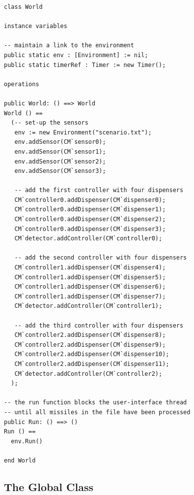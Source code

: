 \documentclass{overturerepchap}
\begin{document}
\begin{lstlisting}
class World

instance variables
  
-- maintain a link to the environment
public static env : [Environment] := nil;
public static timerRef : Timer := new Timer();

operations

public World: () ==> World
World () ==
  (-- set-up the sensors
   env := new Environment("scenario.txt");
   env.addSensor(CM`sensor0);
   env.addSensor(CM`sensor1);
   env.addSensor(CM`sensor2);
   env.addSensor(CM`sensor3);

   -- add the first controller with four dispensers
   CM`controller0.addDispenser(CM`dispenser0);
   CM`controller0.addDispenser(CM`dispenser1);
   CM`controller0.addDispenser(CM`dispenser2);
   CM`controller0.addDispenser(CM`dispenser3);
   CM`detector.addController(CM`controller0);

   -- add the second controller with four dispensers
   CM`controller1.addDispenser(CM`dispenser4);
   CM`controller1.addDispenser(CM`dispenser5);
   CM`controller1.addDispenser(CM`dispenser6);
   CM`controller1.addDispenser(CM`dispenser7);
   CM`detector.addController(CM`controller1);
 
   -- add the third controller with four dispensers
   CM`controller2.addDispenser(CM`dispenser8);
   CM`controller2.addDispenser(CM`dispenser9);
   CM`controller2.addDispenser(CM`dispenser10);
   CM`controller2.addDispenser(CM`dispenser11);
   CM`detector.addController(CM`controller2);
  );

-- the run function blocks the user-interface thread
-- until all missiles in the file have been processed
public Run: () ==> ()
Run () == 
  env.Run()

end World
\end{lstlisting}

\subsection{The Global Class}
\end{document}

